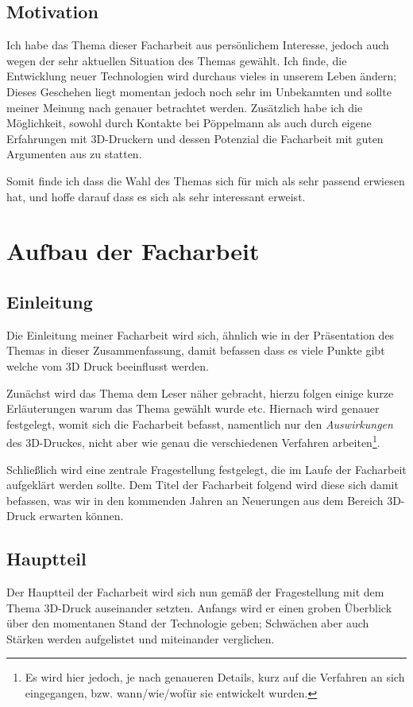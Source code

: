 \documentclass[a4paper, 11pt]{article}
\begin{document}
\subsection{Motivation}
Ich habe das Thema dieser Facharbeit aus persönlichem Interesse, jedoch auch wegen der sehr aktuellen Situation des Themas gewählt. Ich finde, die Entwicklung neuer Technologien wird durchaus vieles in unserem Leben ändern; Dieses Geschehen liegt momentan jedoch noch sehr im Unbekannten und sollte meiner Meinung nach genauer betrachtet werden.
Zusätzlich habe ich die Möglichkeit, sowohl durch Kontakte bei Pöppelmann als auch durch eigene Erfahrungen mit 3D-Druckern und dessen Potenzial die Facharbeit mit guten Argumenten aus zu statten.

Somit finde ich dass die Wahl des Themas sich für mich als sehr passend erwiesen hat, und hoffe darauf dass es sich als sehr interessant erweist.


\section[Aufbau]{Aufbau der Facharbeit}
\subsection{Einleitung}
Die Einleitung meiner Facharbeit wird sich, ähnlich wie in der Präsentation des Themas in dieser Zusammenfassung, damit befassen dass es viele Punkte gibt welche vom 3D Druck beeinflusst werden. 

Zunächst wird das Thema dem Leser näher gebracht, hierzu folgen einige kurze Erläuterungen warum das Thema gewählt wurde etc.
Hiernach wird genauer festgelegt, womit sich die Facharbeit befasst, namentlich nur den \emph{Auswirkungen} des 3D-Druckes, nicht aber wie genau die verschiedenen Verfahren arbeiten\footnote{Es wird hier jedoch, je nach genaueren Details, kurz auf die Verfahren an sich eingegangen, bzw. wann/wie/wofür sie entwickelt wurden.}.

Schließlich wird eine zentrale Fragestellung festgelegt, die im Laufe der Facharbeit aufgeklärt werden sollte. Dem Titel der Facharbeit folgend wird diese sich damit befassen, was wir in den kommenden Jahren an Neuerungen aus dem Bereich 3D-Druck erwarten können. 

\subsection{Hauptteil}
Der Hauptteil der Facharbeit wird sich nun gemäß der Fragestellung mit dem Thema 3D-Druck auseinander setzten.
Anfangs wird er einen groben Überblick über den momentanen Stand der Technologie geben; Schwächen aber auch Stärken werden aufgelistet und miteinander verglichen.
\end{document}
